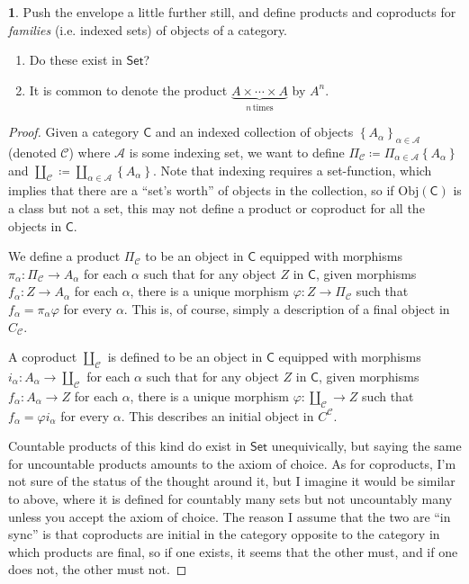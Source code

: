 \documentclass{article}
\theoremstyle{definition}
\newtheorem{ex}{}[section]
\begin{document}
\begin{ex}
	Push the envelope a little further still, and define products and coproducts for \textit{families} (i.e. indexed sets) of objects of a category.
	\begin{enumerate}[label=]
		\item Do these exist in $\mathsf{Set}$?
		\item It is common to denote the product $\underbrace{A \times \cdots \times A}_{n\,\text{times}}$ by $A^n$.
	\end{enumerate}
\end{ex}
\begin{proof}
	Given a category $\mathsf{C}$ and an indexed collection of objects $\left\lbrace A_{\alpha} \right\rbrace_{\alpha \in \mathscr{A}}$ (denoted $\mathscr{C}$) where $\mathscr{A}$ is some indexing set, we want to define $\Pi_\mathscr{C} \coloneq \Pi_{\alpha \in \mathscr{A}} \left\lbrace A_\alpha \right\rbrace$ and $\amalg_\mathscr{C} \coloneq \amalg_{\alpha \in \mathscr{A}}\left\lbrace A_\alpha \right\rbrace$.
	Note that indexing requires a set-function, which implies that there are a ``set's worth'' of objects in the collection, so if $\mathrm{Obj}(\mathsf{C})$ is a class but not a set, this may not define a product or coproduct for all the objects in $\mathsf{C}$.

	We define a product $\Pi_\mathscr{C}$ to be an object in $\mathsf{C}$ equipped with morphisms $\pi_\alpha : \Pi_\mathscr{C} \to A_\alpha$ for each $\alpha$ such that for any object $Z$ in $\mathsf{C}$, given morphisms $f_\alpha : Z \to A_\alpha$ for each $\alpha$, there is a unique morphism $\varphi : Z \to \Pi_\mathscr{C}$ such that $f_\alpha = \pi_\alpha \varphi$ for every $\alpha$.
	This is, of course, simply a description of a final object in $C_{\mathscr{C}}$.

	A coproduct $\amalg_{\mathscr{C}}$ is defined to be an object in $\mathsf{C}$ equipped with morphisms $i_\alpha : A_\alpha \to \amalg_{\mathscr{C}}$ for each $\alpha$ such that for any object $Z$ in $\mathsf{C}$, given morphisms $f_\alpha : A_\alpha \to Z$ for each $\alpha$, there is a unique morphism $\varphi : \amalg_{\mathscr{C}} \to Z$ such that $f_\alpha = \varphi i_\alpha$ for every $\alpha$.
	This describes an initial object in $C^{\mathscr{C}}$.

	Countable products of this kind do exist in $\mathsf{Set}$ unequivically, but saying the same for uncountable products amounts to the axiom of choice.
	As for coproducts, I'm not sure of the status of the thought around it, but I imagine it would be similar to above, where it is defined for countably many sets but not uncountably many unless you accept the axiom of choice.
	The reason I assume that the two are ``in sync'' is that coproducts are initial in the category opposite to the category in which products are final, so if one exists, it seems that the other must, and if one does not, the other must not.
\end{proof}
\end{document}
